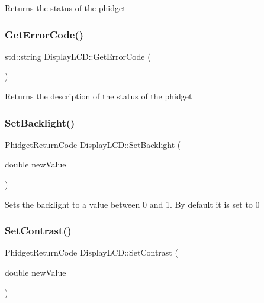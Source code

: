 Returns the status of the phidget\mbox{\label{classDisplayLCD_af29a65af420a16e9995e7e2187e4af99}} 
\subsubsection{\texorpdfstring{Get\+Error\+Code()}{GetErrorCode()}}
{\footnotesize\ttfamily std\+::string Display\+L\+C\+D\+::\+Get\+Error\+Code (\begin{DoxyParamCaption}{ }\end{DoxyParamCaption})\hspace{0.3cm}{\ttfamily [inline]}}

Returns the description of the status of the phidget\mbox{\label{classDisplayLCD_acd9635087f3d813a39aa0b266f05203a}} 
\subsubsection{\texorpdfstring{Set\+Backlight()}{SetBacklight()}}
{\footnotesize\ttfamily Phidget\+Return\+Code Display\+L\+C\+D\+::\+Set\+Backlight (\begin{DoxyParamCaption}\item[{double}]{new\+Value }\end{DoxyParamCaption})\hspace{0.3cm}{\ttfamily [inline]}}

Sets the backlight to a value between 0 and 1. By default it is set to 0\mbox{\label{classDisplayLCD_a4e97d5bbd320dd69724809d3f446b578}} 
\subsubsection{\texorpdfstring{Set\+Contrast()}{SetContrast()}}
{\footnotesize\ttfamily Phidget\+Return\+Code Display\+L\+C\+D\+::\+Set\+Contrast (\begin{DoxyParamCaption}\item[{double}]{new\+Value }\end{DoxyParamCaption})\hspace{0.3cm}{\ttfamily [inline]}}

